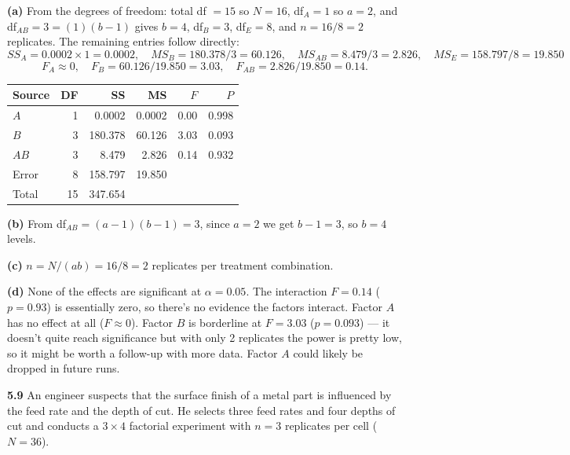 \documentclass[answers,12pt,addpoints]{exam}
\begin{document}
\begin{solution}

\textbf{(a)} From the degrees of freedom: total df $= 15$ so $N = 16$, df$_A = 1$ so $a = 2$, and df$_{AB} = 3 = (1)(b-1)$ gives $b = 4$, df$_B = 3$, df$_E = 8$, and $n = 16/8 = 2$ replicates. The remaining entries follow directly:
\[
  SS_A = 0.0002 \times 1 = 0.0002, \quad
  MS_B = 180.378/3 = 60.126, \quad
  MS_{AB} = 8.479/3 = 2.826, \quad
  MS_E = 158.797/8 = 19.850
\]
\[
  F_A \approx 0, \quad F_B = 60.126/19.850 = 3.03, \quad F_{AB} = 2.826/19.850 = 0.14.
\]

\begin{center}
\begin{tabular}{lrrrrr}
\hline
Source      & DF &    SS      &    MS     & $F$     & $P$   \\
\hline
$A$         &  1 &     0.0002 &    0.0002 & 0.00    & 0.998 \\
$B$         &  3 &   180.378  &   60.126  & 3.03    & 0.093 \\
$AB$        &  3 &     8.479  &    2.826  & 0.14    & 0.932 \\
Error       &  8 &   158.797  &   19.850  &         &       \\
\hline
Total       & 15 &   347.654  &           &         &       \\
\hline
\end{tabular}
\end{center}

\textbf{(b)} From df$_{AB} = (a-1)(b-1) = 3$, since $a=2$ we get $b-1=3$, so $b = 4$ levels.

\textbf{(c)} $n = N/(ab) = 16/8 = 2$ replicates per treatment combination.

\textbf{(d)} None of the effects are significant at $\alpha = 0.05$. The interaction $F = 0.14$ ($p = 0.93$) is essentially zero, so there's no evidence the factors interact. Factor $A$ has no effect at all ($F \approx 0$). Factor $B$ is borderline at $F = 3.03$ ($p = 0.093$) — it doesn't quite reach significance but with only 2 replicates the power is pretty low, so it might be worth a follow-up with more data. Factor $A$ could likely be dropped in future runs.

\end{solution}

\textbf{5.9} An engineer suspects that the surface finish of a metal part
is influenced by the feed rate and the depth of cut.  He selects three
feed rates and four depths of cut and conducts a $3\times 4$ factorial
experiment with $n=3$ replicates per cell ($N=36$).
\end{document}
